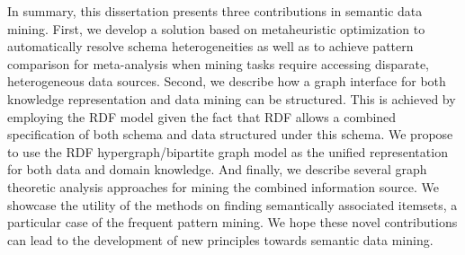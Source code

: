 {In summary, this dissertation presents three contributions in semantic data mining. First, we develop a solution based on metaheuristic optimization to automatically resolve schema heterogeneities as well as to achieve pattern comparison for meta-analysis when mining tasks require accessing disparate, heterogeneous data sources. Second, we describe how a graph interface for both knowledge representation and data mining can be structured. This is achieved by employing the RDF model given the fact that RDF allows a combined specification of both schema and data structured under this schema. We propose to use the RDF hypergraph/bipartite graph model as the unified representation for both data and domain knowledge. And finally, we describe several graph theoretic analysis approaches for mining the combined information source. We showcase the utility of the methods on finding semantically associated itemsets, a particular case of the frequent pattern mining. We hope these novel contributions can lead to the development of new principles towards semantic data mining.} 